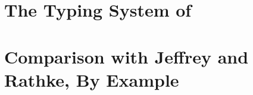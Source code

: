 \documentclass[a4paper,UKenglish]{lipics}
\begin{document}

%
%
{}

\newpage
\appendix 
\section{The Typing System of \HOp}
\label{app:types}


\section{Comparison with Jeffrey and Rathke, By Example}
\label{app:jandr}



\end{document}
